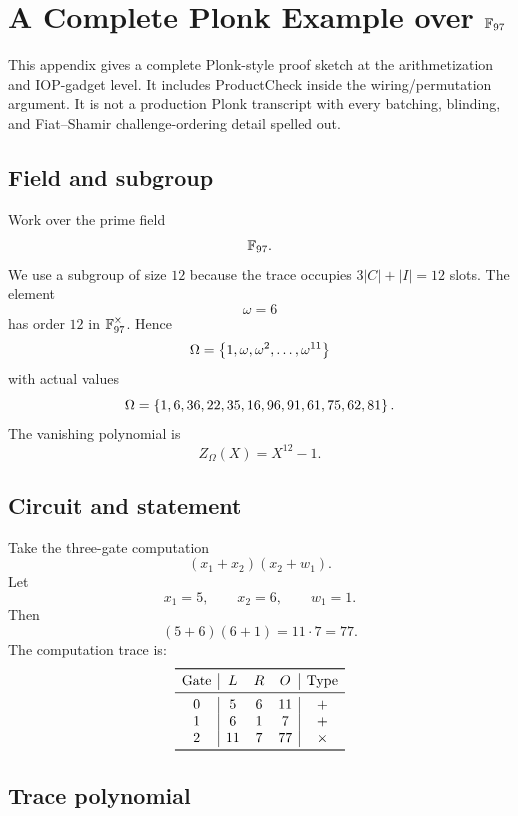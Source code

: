 \section{A Complete Plonk Example over \texorpdfstring{$\mathbb{F}_{97}$}{F97}}
\label{app:plonk-example}

This appendix gives a complete Plonk-style proof sketch at the arithmetization and IOP-gadget level. It includes ProductCheck inside the wiring/permutation argument. It is not a production Plonk transcript with every batching, blinding, and Fiat--Shamir challenge-ordering detail spelled out.

\subsection{Field and subgroup}

Work over the prime field
\[
    \mathbb{F}_{97}.
\]
We use a subgroup of size $12$ because the trace occupies $3|C|+|I|=12$ slots. The element
\[
    \omega=6
\]
has order $12$ in $\mathbb{F}_{97}^\times$. Hence
\[
    \Omega=\left\{1,\omega,\omega^2,\ldots,\omega^{11}\right\}
\]
with actual values
\[
    \Omega=\left\{1,6,36,22,35,16,96,91,61,75,62,81\right\}.
\]
The vanishing polynomial is
\[
    Z_\Omega(X)=X^{12}-1.
\]

\subsection{Circuit and statement}

Take the three-gate computation
\[
    (x_1+x_2)(x_2+w_1).
\]
Let
\[
    x_1=5,
    \qquad
    x_2=6,
    \qquad
    w_1=1.
\]
Then
\[
    (5+6)(6+1)=11\cdot7=77.
\]
The computation trace is:
\[
\begin{array}{c|ccc|c}
\toprule
\text{Gate} & L & R & O & \text{Type}\\
\midrule
0 & 5 & 6 & 11 & +\\
1 & 6 & 1 & 7 & +\\
2 & 11 & 7 & 77 & \times\\
\bottomrule
\end{array}
\]

\subsection{Trace polynomial}

